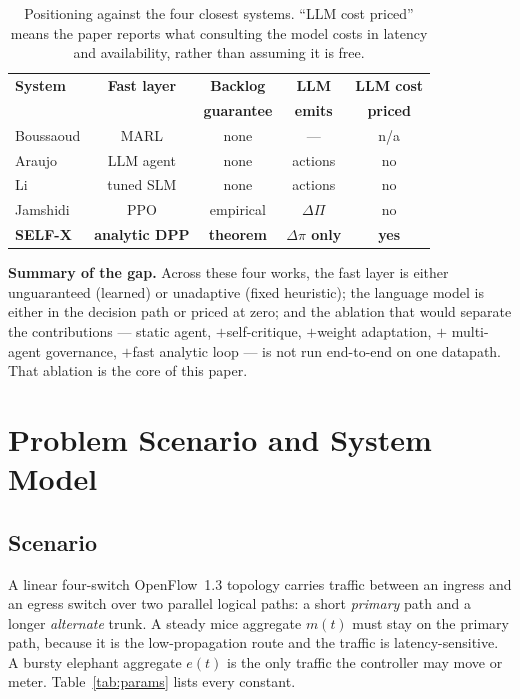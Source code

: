 \documentclass[conference]{IEEEtran}
\newcommand{\dpi}{\Delta\pi}
\begin{document}
\begin{table}[t]
\caption{Positioning against the four closest systems. ``LLM cost priced'' means
the paper reports what consulting the model costs in latency and availability,
rather than assuming it is free.}
\label{tab:positioning}
\centering
\footnotesize
\renewcommand{\arraystretch}{1.18}
\setlength{\tabcolsep}{3.2pt}
\begin{tabular}{lcccc}
\toprule
\textbf{System} & \textbf{Fast layer} & \textbf{Backlog} & \textbf{LLM} & \textbf{LLM cost} \\
 & & \textbf{guarantee} & \textbf{emits} & \textbf{priced} \\
\midrule
Boussaoud \cite{boussaoud2025marl} & MARL        & none      & ---            & n/a \\
Araujo \cite{araujo2024agentic}    & LLM agent   & none      & actions        & no \\
Li \cite{li2026redsi}              & tuned SLM   & none      & actions        & no \\
Jamshidi \cite{jamshidi2026governance} & PPO     & empirical & $\Delta\Pi$    & no \\
\textbf{SELF-X} & \textbf{analytic DPP} & \textbf{theorem} & \textbf{$\dpi$ only}
  & \textbf{yes} \\
\bottomrule
\end{tabular}
\end{table}

\textbf{Summary of the gap.} Across these four works, the fast layer is either
unguaranteed (learned) or unadaptive (fixed heuristic); the language model is
either in the decision path or priced at zero; and the ablation that would separate
the contributions --- static agent, $+$self-critique, $+$weight adaptation, $+$
multi-agent governance, $+$fast analytic loop --- is not run end-to-end on one
datapath. That ablation is the core of this paper.

\section{Problem Scenario and System Model}\label{sec:model}

\subsection{Scenario}
A linear four-switch OpenFlow~1.3 topology carries traffic between an ingress and
an egress switch over two parallel logical paths: a short \emph{primary} path and a
longer \emph{alternate} trunk. A steady mice aggregate $m(t)$ must stay on the
primary path, because it is the low-propagation route and the traffic is
latency-sensitive. A bursty elephant aggregate $e(t)$ is the only traffic the
controller may move or meter. Table~\ref{tab:params} lists every constant.
\end{document}
